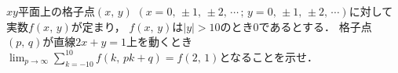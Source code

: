 \documentclass[../../main.tex]{subfiles}
\begin{document}
$xy$平面上の格子点$(x, \, y)$ $(x=0, \, \pm1, \, \pm2, \, \cdots \, ; \,
y=0, \, \pm1, \, \pm2, \, \cdots)$に対して実数$f(x, \, y)$が定まり，
$f(x, \, y)$は$|y|>10$のとき0であるとする．
格子点$(p, \, q)$が直線$2x+y=1$上を動くとき
$\displaystyle\lim_{p\to\infty}\sum_{k=-10}^{10}f(k, \, pk+q)=f(2, \, 1)$となることを示せ．
\end{document}
